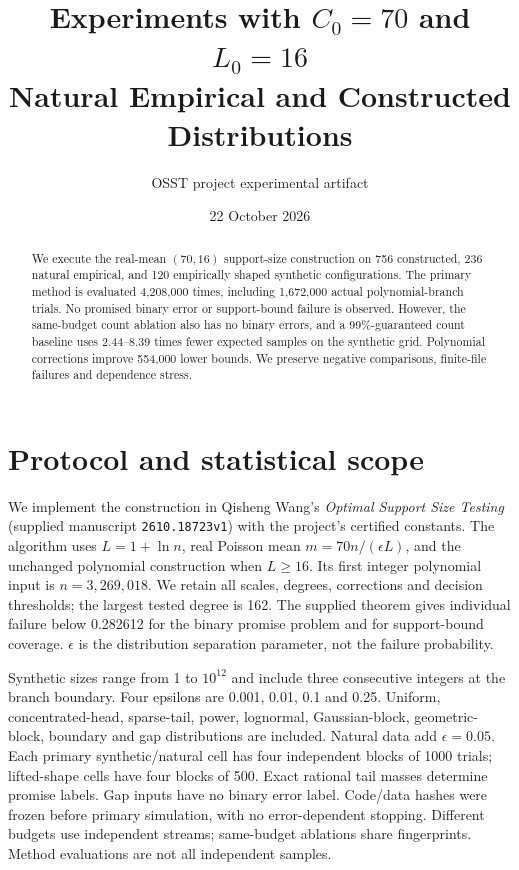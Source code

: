 \documentclass[11pt]{article}
\title{Experiments with $C_0=70$ and $L_0=16$\\Natural Empirical and Constructed Distributions}
\author{OSST project experimental artifact}
\date{22 October 2026}
\begin{document}
\maketitle
\begin{abstract}
We execute the real-mean $(70,16)$ support-size construction on 756 constructed,
236 natural empirical, and 120 empirically shaped synthetic configurations.
The primary method is evaluated 4,208,000 times, including 1,672,000 actual
polynomial-branch trials. No promised binary error or support-bound failure
is observed. However, the same-budget count ablation also has no binary errors,
and a 99\%-guaranteed count baseline uses 2.44--8.39 times fewer expected samples
on the synthetic grid. Polynomial corrections improve 554,000 lower bounds.
We preserve negative comparisons, finite-file failures and dependence stress.
\end{abstract}
\section{Protocol and statistical scope}
We implement the construction in Qisheng Wang's \emph{Optimal Support Size Testing}
(supplied manuscript \texttt{2610.18723v1}) with the project's certified constants.
The algorithm uses $L=1+\ln n$, real Poisson mean
$m=70n/(\epsilon L)$, and the unchanged polynomial construction when $L\ge16$.
Its first integer polynomial input is $n=3,269,018$. We retain all scales,
degrees, corrections and decision thresholds; the largest tested degree is 162.
The supplied theorem gives individual failure below 0.282612 for the binary
promise problem and for support-bound coverage. $\epsilon$ is the distribution
separation parameter, not the failure probability.

Synthetic sizes range from 1 to $10^{12}$ and include three consecutive
integers at the branch boundary. Four epsilons are 0.001, 0.01, 0.1 and 0.25.
Uniform, concentrated-head, sparse-tail, power, lognormal, Gaussian-block,
geometric-block, boundary and gap distributions are included. Natural data add
$\epsilon=0.05$. Each primary synthetic/natural cell has four independent blocks
of 1000 trials; lifted-shape cells have four blocks of 500. Exact rational
tail masses determine promise labels. Gap inputs have no binary error label.
Code/data hashes were frozen before primary simulation, with no error-dependent
stopping. Different budgets use independent streams; same-budget ablations
share fingerprints. Method evaluations are not all independent samples.
\end{document}
